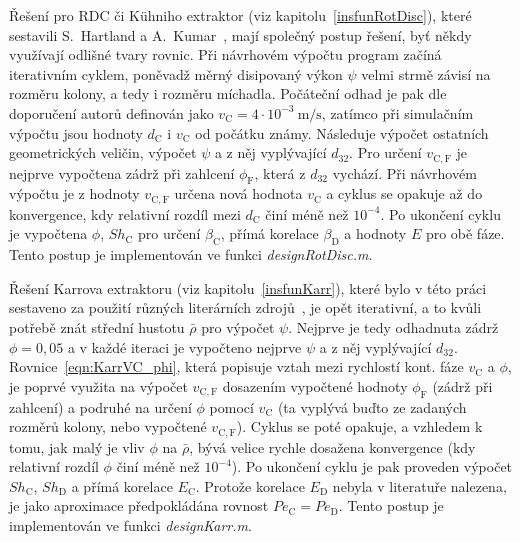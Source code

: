 Řešení pro RDC či Kühniho extraktor (viz kapitolu~\ref{insfunRotDisc}), které sestavili S.~Hartland a A.~Kumar~\cite{HartlandKumar1997}, mají společný postup řešení, byť někdy využívají odlišné tvary rovnic.
Při návrhovém výpočtu program začíná iterativním cyklem, poněvadž měrný disipovaný výkon $\psi$ velmi strmě závisí na rozměru kolony, a tedy i rozměru míchadla.
Počáteční odhad je pak dle doporučení autorů definován jako $v_\mathrm{C} = 4 \cdot 10^{-3}~\mathrm{m/s}$, zatímco při simulačním výpočtu jsou hodnoty $d_\mathrm{C}$ i $v_\mathrm{C}$ od počátku známy.
Následuje výpočet ostatních geometrických veličin, výpočet $\psi$ a z něj vyplývající $d_{32}$.
Pro určení $v_\mathrm{C,F}$ je nejprve vypočtena zádrž při zahlcení $\phi_\mathrm{F}$, která z $d_{32}$ vychází.
Při návrhovém výpočtu je z hodnoty $v_\mathrm{C,F}$ určena nová hodnota $v_\mathrm{C}$ a cyklus se opakuje až do konvergence, kdy relativní rozdíl mezi $d_\mathrm{C}$ činí méně než $10^{-4}$.
Po ukončení cyklu je vypočtena $\phi$, $Sh_\mathrm{C}$ pro určení $\beta_\mathrm{C}$, přímá korelace $\beta_\mathrm{D}$ a hodnoty $E$ pro obě fáze.
Tento postup je implementován ve funkci \textit{designRotDisc.m}.

Řešení Karrova extraktoru (viz kapitolu~\ref{insfunKarr}), které bylo v této práci sestaveno za použití různých literárních zdrojů~\cite{Baird1984,Kumar1999,Baird1976,Baird1979}, je opět iterativní, a to kvůli potřebě znát střední hustotu $\bar{\rho}$ pro výpočet $\psi$.
Nejprve je tedy odhadnuta zádrž $\phi = 0,05$ a v každé iteraci je vypočteno nejprve $\psi$ a z něj vyplývající $d_{32}$.
Rovnice~\ref{eqn:KarrVC_phi}, která popisuje vztah mezi rychlostí kont. fáze $v_\mathrm{C}$ a $\phi$, je poprvé využita na výpočet $v_\mathrm{C,F}$ dosazením vypočtené hodnoty $\phi_\mathrm{F}$ (zádrž při zahlcení) a podruhé na určení $\phi$ pomocí $v_\mathrm{C}$ (ta vyplývá buďto ze zadaných rozměrů kolony, nebo vypočtené $v_\mathrm{C,F}$).
Cyklus se poté opakuje, a vzhledem k tomu, jak malý je vliv $\phi$ na $\bar{\rho}$, bývá velice rychle dosažena konvergence (kdy relativní rozdíl $\phi$ činí méně než $10^{-4}$).
Po ukončení cyklu je pak proveden výpočet $Sh_\mathrm{C}$, $Sh_\mathrm{D}$ a přímá korelace $E_\mathrm{C}$.
Protože korelace $E_\mathrm{D}$ nebyla v literatuře nalezena, je jako aproximace předpokládána rovnost $Pe_\mathrm{C} = Pe_\mathrm{D}$.
Tento postup je implementován ve funkci \textit{designKarr.m}.
